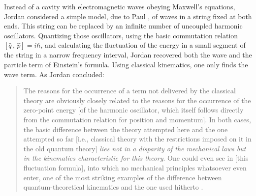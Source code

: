 Instead of a cavity with electromagnetic waves obeying Maxwell's equations, Jordan considered a simple model, due to Paul \citet{Ehrenfest 1925}, of waves in a string fixed at both ends. This string can be replaced by an infinite number of uncoupled harmonic oscillators. Quantizing those oscillators, using the basic commutation relation $[\hat{q} \, , \, \hat{p}] = i\hbar$, and calculating the fluctuation of the energy in a small segment of the string in a narrow frequency interval, Jordan recovered both the wave and the particle term of Einstein's formula. Using classical kinematics, one only finds the wave term. As Jordan concluded:  
\begin{quote}
The reasons for the occurrence of a term not delivered by the classical theory are obviously closely related to the reasons for the occurrence of the zero-point energy [of the harmonic oscillator, which itself follows directly from the commutation relation for position and momentum]. In both cases, the basic difference between the theory attempted here and the one attempted so far  [i.e., classical theory with the restrictions imposed on it in the old quantum theory] \emph{lies not in a disparity of the mechanical laws but in the kinematics characteristic for this theory}. One could even see in [this fluctuation formula], into which no mechanical principles whatsoever even enter, one of the most striking examples of the difference between quantum-theoretical kinematics and the one used hitherto \citep[p.\ 385; our emphasis and our translation, quoted in part in Janssen, 2009, p.\ 50]{dreimaenner}.
\end{quote}

